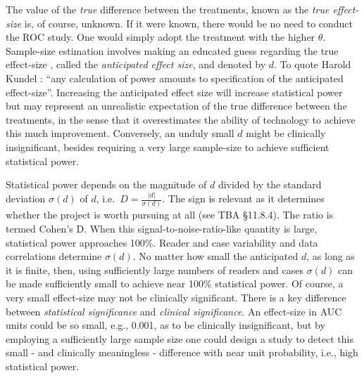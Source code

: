 \documentclass[
]{book}
\begin{document}
The value of the \emph{true} difference between the treatments, known as the \emph{true effect-size} is, of course, unknown. If it were known, there would be no need to conduct the ROC study. One would simply adopt the treatment with the higher \(\theta\). Sample-size estimation involves making an educated guess regarding the true effect-size , called the \emph{anticipated effect size}, and denoted by \(d\). To quote Harold Kundel \citep{RN1383}: ``any calculation of power amounts to specification of the anticipated effect-size''. Increasing the anticipated effect size will increase statistical power but may represent an unrealistic expectation of the true difference between the treatments, in the sense that it overestimates the ability of technology to achieve this much improvement. Conversely, an unduly small \(d\) might be clinically insignificant, besides requiring a very large sample-size to achieve sufficient statistical power.

Statistical power depends on the magnitude of \(d\) divided by the standard deviation \(\sigma(d)\) of \(d\), i.e.~\(D=\frac{\left | d \right |}{\sigma (d)}\). The sign is relevant as it determines whether the project is worth pursuing at all (see TBA §11.8.4). The ratio is termed \citep{cohen1988statistical} Cohen's D. When this signal-to-noise-ratio-like quantity is large, statistical power approaches 100\%. Reader and case variability and data correlations determine \(\sigma(d)\). No matter how small the anticipated \(d\), as long as it is finite, then, using sufficiently large numbers of readers and cases \(\sigma(d)\) can be made sufficiently small to achieve near 100\% statistical power. Of course, a very small effect-size may not be clinically significant. There is a key difference between \emph{statistical significance} and \emph{clinical significance}. An effect-size in AUC units could be so small, e.g., 0.001, as to be clinically insignificant, but by employing a sufficiently large sample size one could design a study to detect this small - and clinically meaningless - difference with near unit probability, i.e., high statistical power.
\end{document}
